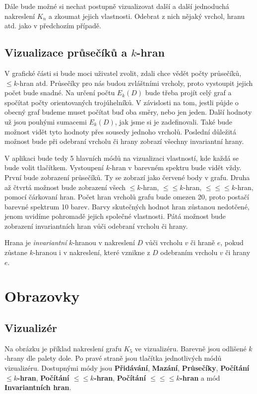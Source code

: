 \documentclass{article}
\begin{document}
Dále bude možné si nechat postupně vizualizovat další a další jednoduchá nakreslení $K_n$ a zkoumat jejich vlastnosti. 
Odebrat z nich nějaký vrchol, hranu atd. jako v předchozím případě. 

\subsection{Vizualizace průsečíků a $k$-hran}

V grafické části si bude moci uživatel zvolit, zdali chce vědět počty průsečíků, ${\leq k}$-hran atd. 
Průsečíky pro nás budou zvláštními vrcholy, proto vystoupit jejich počet bude snadné. Na určení počtu $E_k(D)$ bude třeba projít celý graf a spočítat počty orientovaných trojúhelníků. V závislosti na tom, jestli půjde o obecný graf budeme muset počítat buď oba směry, nebo jen jeden. Další hodnoty už jsou pouhými sumacemi $E_k(D)$, jak jsme si je zadefinovali. 
Také bude možnost vidět tyto hodnoty přes sousedy jednoho vrcholů.
Poslední důležitá možnost bude při odebraní vrcholu či hrany zobrazí všechny invariantní hrany.

V aplikaci bude tedy 5 hlavních módů na vizualizaci vlastností, kde každá se bude volit tlačítkem. Vystoupení $k$-hran v barevném spektru bude vidět vždy.
První bude zobrazení průsečíků. Ty se zobrazí jako červené body v grafu.
Druha až čtvrtá možnost bude zobrazení všech ${\leq k}$-hran, ${\leq\leq k}$-hran, ${\leq\leq\leq k}$-hran, pomocí čárkovaní hran. Počet hran vrcholů grafu bude omezen 20, proto postačí barevné spektrum 10 barev.
Barvy skutečných hodnot hran zůstanou nedotčené, jenom uvidíme pohromadě jejich společné vlastnosti.
Pátá možnost bude zobrazení invariantních hran vůči odebraní vrcholu či hrany.

Hrana je {\it invariantní} $k$-hranou v nakreslení $D$ vůči vrcholu $v$ či hraně $e$, pokud zůstane $k$-hranou i v nakreslení, které vznikne z $D$ odebraním vrcholu $v$ či hrany $e$.

\clearpage

\section{Obrazovky}

\subsection{Vizualizér}

Na obrázku je příklad nakreslení grafu $K_5$ ve vizualizéru. Barevně jsou odlišené $k$-hrany dle palety dole. Po pravé straně jsou tlačítka jednotlivých módů vizualizéru. Dostupnými módy jsou \textbf{Přidávání}, \textbf{Mazání}, \textbf{Průsečíky}, \textbf{Počítání ${\leq k}$-hran}, \textbf{Počítání ${\leq\leq k}$-hran}, \textbf{Počítání ${\leq\leq\leq k}$-hran} a mód \textbf{Invariantních hran}.
\end{document}
